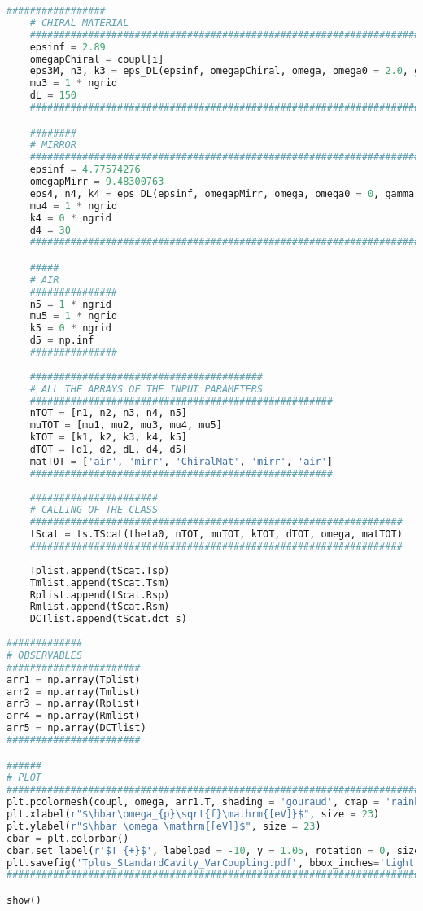 \documentclass[showpacs,aps,prl,onecolumn,superscriptaddress]{revtex4-1}
\begin{document}
\begin{lstlisting}[language=Python, caption=Script for Figure 10 $(a)$]
    #################
    # CHIRAL MATERIAL
    ##########################################################################################
    epsinf = 2.89
    omegapChiral = coupl[i]
    eps3M, n3, k3 = eps_DL(epsinf, omegapChiral, omega, omega0 = 2.0, gamma = 0.05, k0 = 1e-3)
    mu3 = 1 * ngrid
    dL = 150
    ########################################################################################## 

    ########
    # MIRROR
    ########################################################################################
    epsinf = 4.77574276
    omegapMirr = 9.48300763
    eps4, n4, k4 = eps_DL(epsinf, omegapMirr, omega, omega0 = 0, gamma = 0.17486845, k0 = 0)
    mu4 = 1 * ngrid
    k4 = 0 * ngrid
    d4 = 30
    ######################################################################################## 

    #####
    # AIR
    ###############
    n5 = 1 * ngrid
    mu5 = 1 * ngrid
    k5 = 0 * ngrid
    d5 = np.inf
    ###############
    
    ########################################
    # ALL THE ARRAYS OF THE INPUT PARAMETERS
    ####################################################
    nTOT = [n1, n2, n3, n4, n5]
    muTOT = [mu1, mu2, mu3, mu4, mu5]
    kTOT = [k1, k2, k3, k4, k5] 
    dTOT = [d1, d2, dL, d4, d5] 
    matTOT = ['air', 'mirr', 'ChiralMat', 'mirr', 'air']
    ####################################################
    
    ######################
    # CALLING OF THE CLASS
    ################################################################
    tScat = ts.TScat(theta0, nTOT, muTOT, kTOT, dTOT, omega, matTOT)  
    ################################################################
    
    Tplist.append(tScat.Tsp)
    Tmlist.append(tScat.Tsm)
    Rplist.append(tScat.Rsp)
    Rmlist.append(tScat.Rsm)
    DCTlist.append(tScat.dct_s)
    
#############
# OBSERVABLES
#######################    
arr1 = np.array(Tplist)
arr2 = np.array(Tmlist)
arr3 = np.array(Rplist)
arr4 = np.array(Rmlist)
arr5 = np.array(DCTlist)
#######################

######
# PLOT
############################################################################
plt.pcolormesh(coupl, omega, arr1.T, shading = 'gouraud', cmap = 'rainbow') 
plt.xlabel(r"$\hbar\omega_{p}\sqrt{f}\mathrm{[eV]}$", size = 23)
plt.ylabel(r"$\hbar \omega \mathrm{[eV]}$", size = 23)
cbar = plt.colorbar()
cbar.set_label(r'$T_{+}$', labelpad = -10, y = 1.05, rotation = 0, size = 14)
plt.savefig('Tplus_StandardCavity_VarCoupling.pdf', bbox_inches='tight')
############################################################################

show() 
\end{lstlisting}
\end{document}
